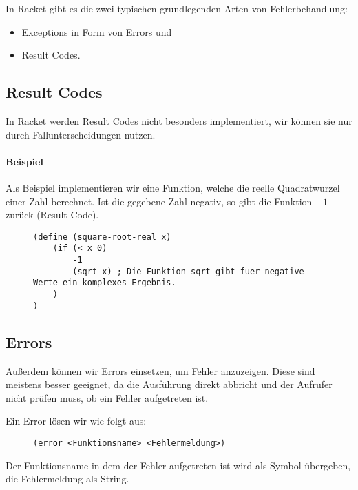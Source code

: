 
In Racket gibt es die zwei typischen grundlegenden Arten von Fehlerbehandlung:
\begin{itemize}
	\item Exceptions in Form von Errors und
	\item Result Codes.
\end{itemize}

\subsection{Result Codes}
	
	In Racket werden Result Codes nicht besonders implementiert, wir können sie nur durch Fallunterscheidungen nutzen.
	
	\paragraph{Beispiel}
		Als Beispiel implementieren wir eine Funktion, welche die reelle Quadratwurzel einer Zahl berechnet. Ist die gegebene Zahl negativ, so gibt die Funktion \(-1\) zurück (Result Code).
		
		\begin{figure}[H]
			\centering
			\begin{lstlisting}[language = Racket]
(define (square-root-real x)
	(if (< x 0)
		-1
		(sqrt x) ; Die Funktion sqrt gibt fuer negative Werte ein komplexes Ergebnis.
	)
)
\end{lstlisting}
		\end{figure}

\subsection{Errors}
	
	Außerdem können wir Errors einsetzen, um Fehler anzuzeigen. Diese sind meistens besser geeignet, da die Ausführung direkt abbricht und der Aufrufer nicht prüfen muss, ob ein Fehler aufgetreten ist.
	
	Ein Error lösen wir wie folgt aus:
	\begin{figure}[H]
		\centering
		\lstinline[language = Racket]|(error <Funktionsname> <Fehlermeldung>)|
	\end{figure}
	Der Funktionsname in dem der Fehler aufgetreten ist wird als Symbol übergeben, die Fehlermeldung als String.
	
